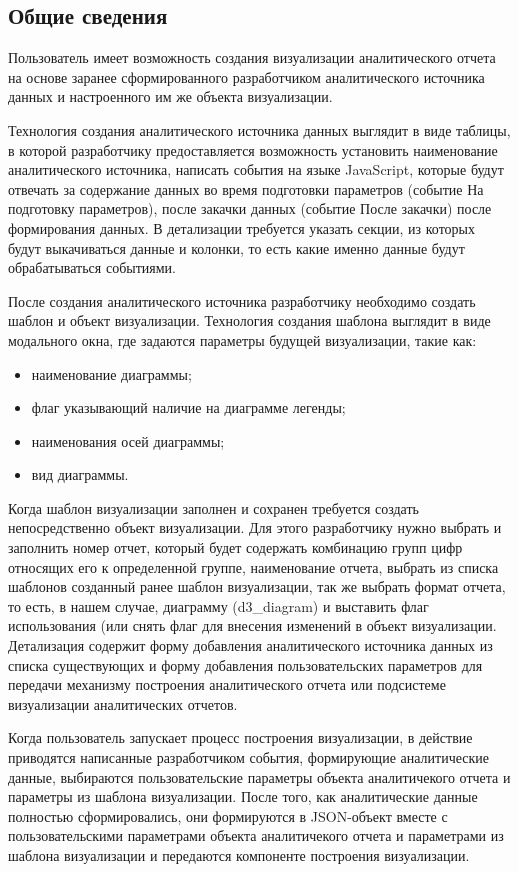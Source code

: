 \documentclass[a4paper]{extarticle}
\begin{document}
\subsection{Общие сведения}
Пользователь имеет возможность создания визуализации аналитического отчета на основе заранее сформированного разработчиком аналитического источника данных и настроенного им же объекта визуализации.\par
Технология создания аналитического источника данных выглядит в виде таблицы, в которой разработчику предоставляется возможность установить наименование аналитического источника, написать события на языке JavaScript, которые будут отвечать за содержание данных во время подготовки параметров (событие На подготовку параметров), после закачки данных (событие После закачки) после формирования данных. В детализации требуется указать секции, из которых будут выкачиваться данные и колонки, то есть какие именно данные будут обрабатываться событиями.\par
После создания аналитического источника разработчику необходимо создать шаблон и объект визуализации. Технология создания шаблона выглядит в виде модального окна, где задаются параметры будущей визуализации, такие как:
\begin{itemize}
  \item наименование диаграммы;
  \item флаг указывающий наличие на диаграмме легенды;
  \item наименования осей диаграммы;
  \item вид диаграммы.
\end{itemize}\par
Когда шаблон визуализации заполнен и сохранен требуется создать непосредственно объект визуализации. Для этого разработчику нужно выбрать и заполнить номер отчет, который будет содержать комбинацию групп цифр относящих его к определенной группе, наименование отчета, выбрать из списка шаблонов созданный ранее шаблон визуализации, так же выбрать формат отчета, то есть, в нашем случае, диаграмму (d3\_diagram) и выставить флаг использования (или снять флаг для внесения изменений в объект визуализации. Детализация содержит форму добавления аналитического источника данных из списка существующих и форму добавления пользовательских параметров для передачи механизму построения аналитического отчета или подсистеме визуализации аналитических отчетов.\par
Когда пользователь запускает процесс построения визуализации, в действие приводятся написанные разработчиком события, формирующие аналитические данные, выбираются пользовательские параметры объекта аналитичекого отчета и параметры из шаблона визуализации. После того, как аналитические данные полностью сформировались, они формируются в JSON-объект вместе с пользовательскими параметрами объекта аналитичекого отчета и параметрами из шаблона визуализации и передаются компоненте построения визуализации.
\end{document}
